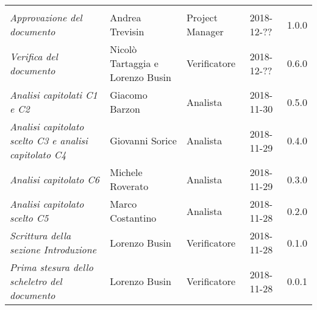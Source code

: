 \newpage 
\section*{}
\begin{table}[H]
	\centering
	\begin{tabular}{p{4cm}|C{3cm}|C{3cm}|R{2.5cm}|R{2cm}}
		
		 & & & & \\
		
		
		\emph{Approvazione del documento} & Andrea Trevisin & Project Manager & 2018-12-?? & 1.0.0 \\
		\hline
		
		\emph{Verifica del documento} & Nicolò Tartaggia e Lorenzo Busin & Verificatore & 2018-12-?? & 0.6.0 \\
		\hline
		
		\emph{Analisi capitolati C1 e C2} & Giacomo Barzon & Analista & 2018-11-30 & 0.5.0 \\
		\hline
		
		\emph{Analisi capitolato scelto C3 e analisi capitolato C4 } & Giovanni Sorice & Analista & 2018-11-29 & 0.4.0 \\
		\hline
		
		\emph{Analisi capitolato C6 } & Michele Roverato & Analista & 2018-11-29 & 0.3.0 \\
		\hline
		
		\emph{Analisi capitolato scelto C5 } & Marco Costantino & Analista & 2018-11-28 & 0.2.0 \\
		\hline
		
		\emph{Scrittura della sezione Introduzione } & Lorenzo Busin & Verificatore & 2018-11-28 & 0.1.0 \\
		\hline
		
		\emph{Prima stesura dello scheletro del documento} & Lorenzo Busin & Verificatore & 2018-11-28 & 0.0.1 \\
		
	\end{tabular}
	
\end{table}


\clearpage